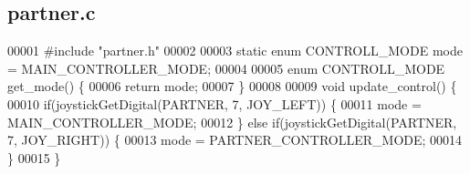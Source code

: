 \subsection{partner.\+c}
\label{partner_8c_source}

\begin{DoxyCode}
00001 \textcolor{preprocessor}{#include "partner.h"}
00002 
00003 \textcolor{keyword}{static} \textcolor{keyword}{enum} CONTROLL_MODE mode = MAIN_CONTROLLER_MODE;
00004 
00005 \textcolor{keyword}{enum} CONTROLL_MODE get_mode() \{
00006   \textcolor{keywordflow}{return} mode;
00007 \}
00008 
00009 \textcolor{keywordtype}{void} update_control() \{
00010   \textcolor{keywordflow}{if}(joystickGetDigital(PARTNER, 7, JOY_LEFT)) \{
00011     mode = MAIN_CONTROLLER_MODE;
00012   \} \textcolor{keywordflow}{else} \textcolor{keywordflow}{if}(joystickGetDigital(PARTNER, 7, JOY_RIGHT)) \{
00013     mode = PARTNER_CONTROLLER_MODE;
00014   \}
00015 \}
\end{DoxyCode}
